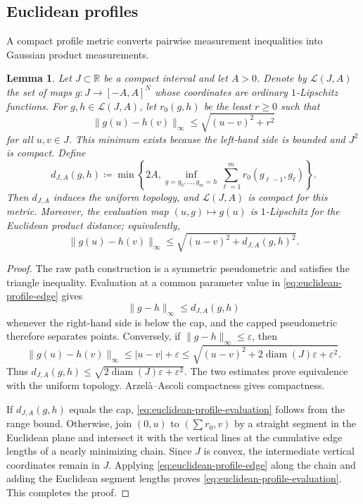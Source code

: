 \documentclass[10pt,a4paper]{amsart}
\numberwithin{equation}{section}
\newtheorem{lemma}[theorem]{Lemma}
\newcommand{\R}{\mathbb R}
\newcommand{\eps}{\varepsilon}
\begin{document}
\subsection{Euclidean profiles}

A compact profile metric converts pairwise measurement inequalities into Gaussian product measurements.

\begin{lemma}\label{lem:euclidean-profile-metric}
Let $J\subset\R$ be a compact interval and let $A>0$.  Denote by $\mathscr L(J,A)$ the set of maps
$g\colon J\to[-A,A]^N$ whose coordinates are ordinary $1$-Lipschitz functions.  For $g,h\in\mathscr L(J,A)$, let
$r_0(g,h)$ be the least $r\ge0$ such that
\begin{equation}\label{eq:euclidean-profile-edge}
 \lVert g(u)-h(v)\rVert_\infty\le\sqrt{(u-v)^2+r^2}
\end{equation}
for all $u,v\in J$.  This minimum exists because the left-hand side is bounded and $J^2$ is compact.  Define
\begin{equation}\label{eq:euclidean-profile-path}
 d_{J,A}(g,h) \coloneqq
 \min\left\{2A, \inf_{g=g_0,\ldots,g_m=h}\sum_{\ell=1}^m r_0(g_{\ell-1},g_\ell)\right\}.
\end{equation}
Then $d_{J,A}$ induces the uniform topology, and $\mathscr L(J,A)$ is compact for this metric.  Moreover, the evaluation
map $(u,g)\mapsto g(u)$ is $1$-Lipschitz for the Euclidean product distance; equivalently,
\begin{equation}\label{eq:euclidean-profile-evaluation}
 \lVert g(u)-h(v)\rVert_\infty \le\sqrt{(u-v)^2+d_{J,A}(g,h)^2}.
\end{equation}
\end{lemma}

\begin{proof}
The raw path construction is a symmetric pseudometric and satisfies the triangle inequality.  Evaluation at a common parameter value in \eqref{eq:euclidean-profile-edge} gives
\[ \lVert g-h\rVert_\infty\le d_{J,A}(g,h) \]
whenever the right-hand side is below the cap, and the capped pseudometric therefore separates points.  Conversely, if $\lVert g-h\rVert_\infty\le\eps$, then
\[ \lVert g(u)-h(v)\rVert_\infty\le|u-v|+\eps
 \le\sqrt{(u-v)^2+2\operatorname{diam}(J)\eps+\eps^2}. \]
Thus $d_{J,A}(g,h)\le\sqrt{2\operatorname{diam}(J)\eps+\eps^2}$.  The two estimates prove equivalence with the uniform
topology.  Arzel\`a--Ascoli compactness gives compactness.

If $d_{J,A}(g,h)$ equals the cap, \eqref{eq:euclidean-profile-evaluation} follows from the range bound.  Otherwise, join
$(0,u)$ to $(\sum r_0,v)$ by a straight segment in the Euclidean plane and intersect it with the vertical lines at the
cumulative edge lengths of a nearly minimizing chain.  Since $J$ is convex, the intermediate vertical coordinates remain
in $J$.  Applying \eqref{eq:euclidean-profile-edge} along the chain and adding the Euclidean segment lengths proves
\eqref{eq:euclidean-profile-evaluation}.  This completes the proof.
\end{proof}
\end{document}
